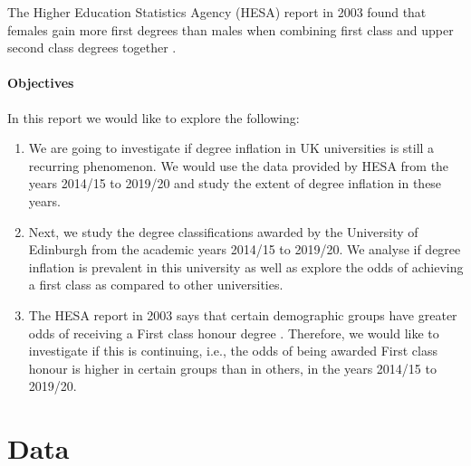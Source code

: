 \documentclass[11pt,a4paper]{article}
\begin{document}
The Higher Education Statistics Agency (HESA) report in 2003 found that females gain more first degrees than males when combining first class and upper second class degrees together \cite{HESA_2003}.

\paragraph{Objectives}

In this report we would like to explore the following:
\begin{enumerate}
    \item We are going to investigate if degree inflation in UK universities is still a recurring phenomenon. We would use the data provided by HESA from the years 2014/15 to 2019/20 and study the extent of degree inflation in these years.
    \item Next, we study the degree classifications awarded by the University of Edinburgh from the academic years 2014/15 to 2019/20. We analyse if degree inflation is prevalent in this university as well as explore the odds of achieving a first class as compared to other universities.
    \item The HESA report in 2003 says that certain demographic groups have greater odds of receiving a First class honour degree \cite{HESA_2003}. Therefore, we would like to investigate if this is continuing, i.e., the odds of being awarded First class honour is higher in certain groups than in others, in the years 2014/15 to 2019/20.
\end{enumerate}



\section{Data}
\end{document}
